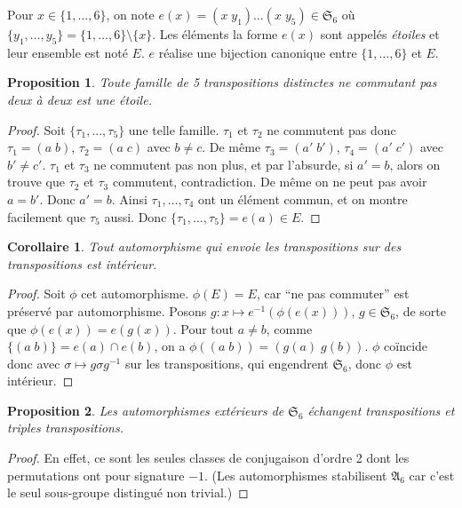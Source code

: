 \documentclass[a4paper, 11pt]{article}
\def\Sigmap{\mathfrak{S}}
\newtheorem*{proposition}{Proposition}
\newtheorem*{corollary}{Corollaire}
\begin{document}
Pour $x \in \{1, \ldots, 6\}$, on note $e(x) = (x\;y_1)\ldots(x\;y_5) \in
\Sigmap_6$ où $\{ y_1, \ldots, y_5 \} = \{1, \ldots, 6\}\setminus\{x\}$. Les
éléments la forme $e(x)$ sont appelés \emph{étoiles} et leur ensemble est noté
$E$. $e$ réalise une bijection canonique entre $\{1, \ldots, 6\}$ et $E$.

\begin{proposition}
  Toute famille de 5 transpositions distinctes ne commutant pas deux à deux est
  une étoile.
\end{proposition}
\begin{proof}
  Soit $\{\tau_1, \ldots, \tau_5\}$ une telle famille. $\tau_1$ et $\tau_2$ ne
  commutent pas donc $\tau_1 = (a\;b)$, $\tau_2 = (a\;c)$ avec $b \neq c$. De
  même $\tau_3 = (a'\;b')$, $\tau_4 = (a'\;c')$ avec $b' \neq c'$. $\tau_1$ et
  $\tau_3$ ne commutent pas non plus, et par l'absurde, si $a' = b$, alors on
  trouve que $\tau_2$ et $\tau_3$ commutent, contradiction. De même on ne peut
  pas avoir $a = b'$. Donc $a' = b$. Ainsi $\tau_1, \ldots, \tau_4$ ont un
  élément commun, et on montre facilement que $\tau_5$ aussi. Donc $\{\tau_1,
  \ldots, \tau_5\} = e(a) \in E$.
\end{proof}

\begin{corollary}
  Tout automorphisme qui envoie les transpositions sur des transpositions est
  intérieur.
\end{corollary}
\begin{proof}
  Soit $\phi$ cet automorphisme. $\phi(E) = E$, car \enquote{ne pas commuter}
  est préservé par automorphisme. Posons $g : x \mapsto e^{-1}(\phi(e(x)))$, $g
  \in \Sigmap_6$, de sorte que $\phi(e(x)) = e(g(x))$. Pour tout $a \neq b$,
  comme $\{(a\;b)\} = e(a) \cap e(b)$, on a $\phi((a\;b)) = (g(a)\;g(b))$.
  $\phi$ coïncide donc avec $\sigma \mapsto g\sigma g^{-1}$ sur les
  transpositions, qui engendrent $\Sigmap_6$, donc $\phi$ est intérieur.
\end{proof}

\begin{proposition}
  Les automorphismes extérieurs de $\Sigmap_6$ échangent transpositions et
  triples transpositions.
\end{proposition}
\begin{proof}
  En effet, ce sont les seules classes de conjugaison d'ordre 2 dont les
  permutations ont pour signature $-1$. (Les automorphismes stabilisent
  $\mathfrak{A}_6$ car c'est le seul sous-groupe distingué non trivial.)
\end{proof}
\end{document}
